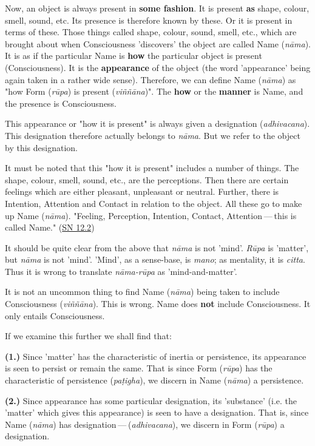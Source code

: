 Now, an object is always present in \textbf{some fashion}. It is present \textbf{as} shape, colour, smell, sound, etc. Its presence is therefore known by these. Or it is present in terms of these. Those things called shape, colour, sound, smell, etc., which are brought about when Consciousness 'discovers' the object are called Name (\emph{nāma}). It is as if the particular Name is \textbf{how} the particular object is present (Consciousness). It is the \textbf{appearance} of the object (the word 'appearance' being again taken in a rather wide sense). Therefore, we can define Name (\emph{nāma}) as "how Form (\emph{rūpa}) is present (\emph{viññāna})". The \textbf{how} or the \textbf{manner} is Name, and the presence is Consciousness.

This appearance or "how it is present" is always given a designation (\emph{adhivacana}). This designation therefore actually belongs to \emph{nāma}. But we refer to the object by this designation.

It must be noted that this "how it is present" includes a number of things. The shape, colour, smell, sound, etc., are the perceptions. Then there are certain feelings which are either pleasant, unpleasant or neutral. Further, there is Intention, Attention and Contact in relation to the object. All these go to make up Name (\emph{nāma}). "Feeling, Perception, Intention, Contact, Attention --- this is called Name." (\href{https://suttacentral.net/sn12.2/en/bodhi}{SN 12.2})

It should be quite clear from the above that \emph{nāma} is not 'mind'. \emph{Rūpa} is 'matter', but \emph{nāma} is not 'mind'. 'Mind', as a sense-base, is \emph{mano}; as mentality, it is \emph{citta}. Thus it is wrong to translate \emph{nāma-rūpa} as 'mind-and-matter'.

It is not an uncommon thing to find Name (\emph{nāma}) being taken to include Consciousness (\emph{viññāna}). This is wrong. Name does \textbf{not} include Consciousness. It only entails Consciousness.

If we examine this further we shall find that:

\textbf{(1.)} Since 'matter' has the characteristic of inertia or persistence, its appearance is seen to persist or remain the same. That is since Form (\emph{rūpa}) has the characteristic of persistence (\emph{paṭigha}), we discern in Name (\emph{nāma}) a persistence.

\textbf{(2.)} Since appearance has some particular designation, its 'substance' (i.e. the 'matter' which gives this appearance) is seen to have a designation. That is, since Name (\emph{nāma}) has designation --- (\emph{adhivacana}), we discern in Form (\emph{rūpa}) a designation.

